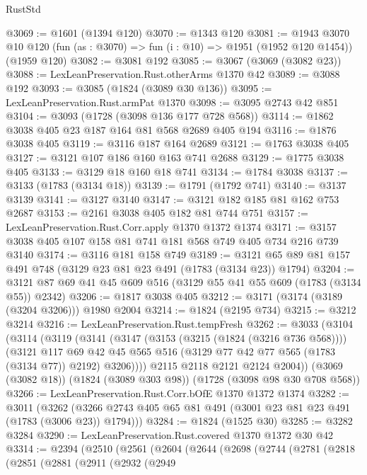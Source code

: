 \begin{lexlean}{RustStd}
\begin{coremodule}
@3069 := @1601 (@1394 @120)
@3070 := @1343 @120
@3081 := @1943
    @3070
    @10
    @120
    (fun (as : @3070) => fun (i : @10) => @1951 (@1952 @120 @1454))
    (@1959 @120)
@3082 := @3081 @192
@3085 := @3067 (@3069 (@3082 @23))
@3088 := LexLeanPreservation.Rust.otherArms @1370 @42
@3089 := @3088 @192
@3093 := @3085 (@1824 (@3089 @30 @136))
@3095 := LexLeanPreservation.Rust.armPat @1370
@3098 := @3095 @2743 @42 @851
@3104 := @3093 (@1728 (@3098 @136 @177 @728 @568))
@3114 := @1862 @3038 @405 @23 @187 @164 @81 @568 @2689 @405 @194
@3116 := @1876 @3038 @405
@3119 := @3116 @187 @164 @2689
@3121 := @1763 @3038 @405
@3127 := @3121 @107 @186 @160 @163 @741 @2688
@3129 := @1775 @3038 @405
@3133 := @3129 @18 @160 @18 @741
@3134 := @1784 @3038
@3137 := @3133 (@1783 (@3134 @18))
@3139 := @1791 (@1792 @741)
@3140 := @3137 @3139
@3141 := @3127 @3140
@3147 := @3121 @182 @185 @81 @162 @753 @2687
@3153 := @2161 @3038 @405 @182 @81 @744 @751
@3157 := LexLeanPreservation.Rust.Corr.apply @1370 @1372 @1374
@3171 := @3157 @3038 @405 @107 @158 @81 @741 @181 @568 @749 @405 @734 @216 @739 @3140
@3174 := @3116 @181 @158 @749
@3189 := @3121 @65 @89 @81 @157 @491 @748 (@3129 @23 @81 @23 @491 (@1783 (@3134 @23)) @1794)
@3204 := @3121 @87 @69 @41 @45 @609 @516 (@3129 @55 @41 @55 @609 (@1783 (@3134 @55)) @2342)
@3206 := @1817 @3038 @405
@3212 := @3171 (@3174 (@3189 (@3204 @3206))) @1980 @2004
@3214 := @1824 (@2195 @734)
@3215 := @3212 @3214
@3216 := LexLeanPreservation.Rust.tempFresh
@3262 := @3033
    (@3104
      (@3114
        (@3119
          (@3141
            (@3147
              (@3153 (@3215 (@1824 (@3216 @736 @568))))
              (@3121
                @117
                @69
                @42
                @45
                @565
                @516
                (@3129 @77 @42 @77 @565 (@1783 (@3134 @77)) @2192)
                @3206))))
        @2115
        @2118
        @2121
        @2124
        @2004))
    (@3069 (@3082 @18))
    (@1824 (@3089 @303 @98))
    (@1728 (@3098 @98 @30 @708 @568))
@3266 := LexLeanPreservation.Rust.Corr.bOfE @1370 @1372 @1374
@3282 := @3011
    (@3262 (@3266 @2743 @405 @65 @81 @491 (@3001 @23 @81 @23 @491 (@1783 (@3006 @23)) @1794)))
@3284 := @1824 (@1525 @30)
@3285 := @3282 @3284
@3290 := LexLeanPreservation.Rust.covered @1370 @1372 @30 @42
@3314 := @2394
    (@2510
      (@2561
        (@2604
          (@2644
            (@2698
              (@2744
                (@2781
                  (@2818
                    (@2851
                      (@2881
                        (@2911
                          (@2932
                            (@2949

\end{coremodule}
\end{lexlean}
